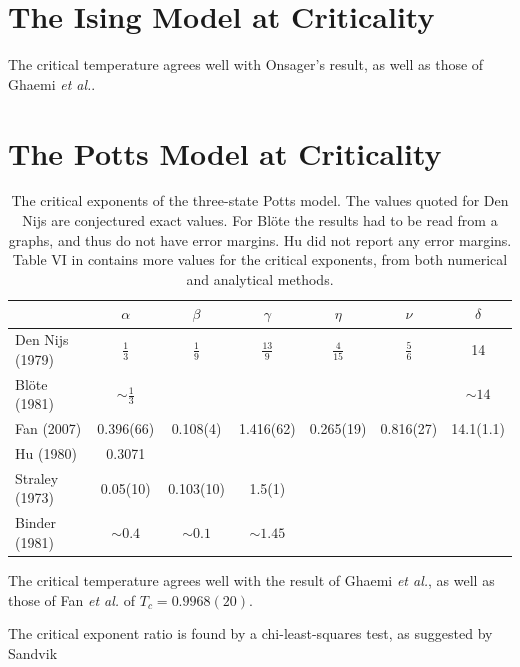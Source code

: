 \documentclass[11pt, a4paper]{report} %
\begin{document}
\section{The Ising Model at Criticality}

The critical temperature agrees well with Onsager's result\cite{onsager:1944}, as well as those of Ghaemi \textit{et al.}\cite{ghaemi:2001}.
\section{The Potts Model at Criticality}

\begin{table}[h]
	\begin{adjustbox}{center}
		\centering
		\renewcommand{\arraystretch}{1.5}
		\begin{tabular}{l | c c c c c c}
			\hline
			& \(\alpha\) & \(\beta\) & \(\gamma\) & \(\eta\) & \(\nu\) & \(\delta\) \\\hline
			Den Nijs (1979)\cite{nijs:1979,baxter:1989} & \(\frac{1}{3}\) & \(\frac{1}{9}\) & \(\frac{13}{9}\) & \(\frac{4}{15}\) & \(\frac{5}{6}\) & 14 \\
			Blöte (1981)\cite{blote:1981} & \(\sim\frac{1}{3}\) & & & & & \(\sim14\)\\
			Fan (2007)\cite{fan:2007} & 0.396(66) & 0.108(4) & 1.416(62) & 0.265(19) & 0.816(27) & 14.1(1.1) \\
			Hu (1980)\cite{hu:1980} & 0.3071 & \\
			Straley (1973)\cite{straley:1973} & 0.05(10)& 0.103(10) & 1.5(1)\\
			Binder (1981)\cite{binder:1981a} & \(\sim0.4\) & \(\sim0.1\) & \(\sim1.45\)\\\hline
		\end{tabular}
	\end{adjustbox}
	\caption{The critical exponents of the three-state Potts model. The values quoted for Den Nijs are conjectured exact values. For Blöte the results had to be read from a graphs, and thus do not have error margins. Hu did not report any error margins.
	Table VI in \cite{wu:1982} contains more values for the critical exponents, from both numerical and analytical methods.}
\end{table}

The critical temperature agrees well with the result of Ghaemi \textit{et al.}\cite{ghaemi:2001}, as well as those of Fan \textit{et al.} of \(T_c = 0.9968(20)\).

The critical exponent ratio is found by a chi-least-squares test, as suggested by Sandvik\cite{sandvik:2011}
\end{document}
